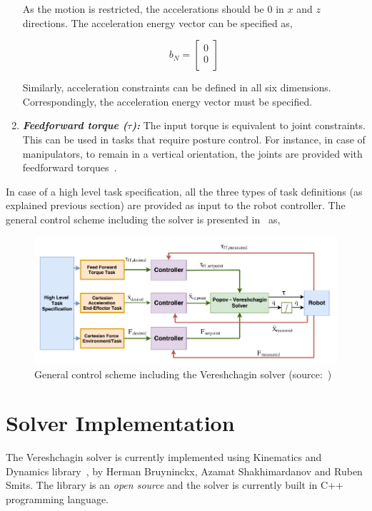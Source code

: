 \begin{enumerate}
	As the motion is restricted, the accelerations should be $0$ in $x$ and $z$ directions. The acceleration energy vector can be specified as, 
	
	\begin{equation} \label{eq:bN}
	b_N = \begin{bmatrix}
	0 \\ 
	0 \\
	\end{bmatrix}
	\end{equation}
	
	Similarly, acceleration constraints can be defined in all six dimensions. Correspondingly, the acceleration energy vector must be specified. 
	
	\item \textit{\textbf{Feedforward torque ($\tau$):}} The input torque is equivalent to joint constraints. This can be used in tasks that require posture control. For instance, in case of manipulators, to remain in a vertical orientation, the joints are provided with feedforward torques~\cite{sentis2005synthesis}.
	
	\end{enumerate}
	
	In case of a high level task specification, all the three types of task definitions (as explained previous section) are provided as input to the robot controller. The general control scheme including the solver is presented in~\cite{vukcevic2018extending} as,
	
	\begin{figure}[h!]
		\label{fig:control-scheme-solver}
		\includegraphics[scale=0.5]{images/control-scheme-solver.png}
		\caption{General control scheme including the Vereshchagin solver (source:~\cite{vukcevic2018extending})}
	\end{figure}

\section{Solver Implementation}

The Vereshchagin solver is currently implemented using Kinematics and Dynamics library~\cite{KDLopensource}, by Herman Bruyninckx, Azamat Shakhimardanov and Ruben Smits. The library is an \textit{open source} and the solver is currently built in C++ programming language. 




